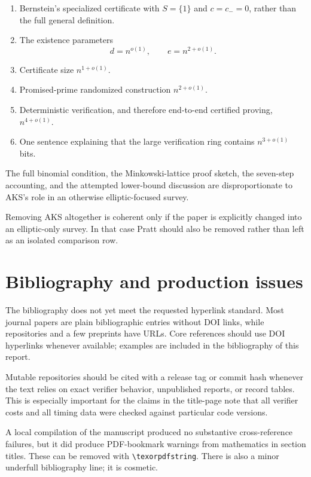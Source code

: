 \documentclass[11pt]{amsart}
\begin{document}
\begin{enumerate}
\item Bernstein's specialized certificate with $S=\{1\}$ and $c=c_-=0$, rather than the full general definition.
\item The existence parameters
\[
 d=n^{o(1)},
 \qquad
 e=n^{2+o(1)}.
\]
\item Certificate size $n^{1+o(1)}$.
\item Promised-prime randomized construction $n^{2+o(1)}$.
\item Deterministic verification, and therefore end-to-end certified proving, $n^{4+o(1)}$.
\item One sentence explaining that the large verification ring contains $n^{3+o(1)}$ bits.
\end{enumerate}

The full binomial condition, the Minkowski-lattice proof sketch, the seven-step accounting, and the attempted lower-bound discussion are disproportionate to AKS's role in an otherwise elliptic-focused survey.

Removing AKS altogether is coherent only if the paper is explicitly changed into an elliptic-only survey.  In that case Pratt should also be removed rather than left as an isolated comparison row.

\section{Bibliography and production issues}

The bibliography does not yet meet the requested hyperlink standard.  Most journal papers are plain bibliographic entries without DOI links, while repositories and a few preprints have URLs.  Core references should use DOI hyperlinks whenever available; examples are included in the bibliography of this report.

Mutable repositories should be cited with a release tag or commit hash whenever the text relies on exact verifier behavior, unpublished reports, or record tables.  This is especially important for the claims in the title-page note that all verifier costs and all timing data were checked against particular code versions.

A local compilation of the manuscript produced no substantive cross-reference failures, but it did produce PDF-bookmark warnings from mathematics in section titles.  These can be removed with \verb|\texorpdfstring|.  There is also a minor underfull bibliography line; it is cosmetic.
\end{document}
